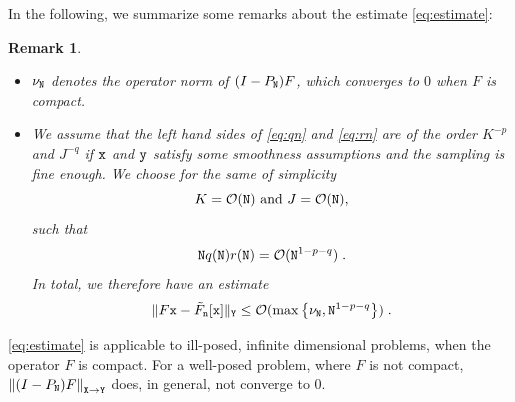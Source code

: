 \documentclass[10pt]{article}
\numberwithin{equation}{section}
\newtheorem{remark}[remark]{Remark}
\theoremstyle{nonumberplain}
\newcommand{\norm}[1]{\left\|#1\right\|}
\newcommand{\norms}[1]{\|#1\|}
\newcommand{\set}[1]{\left\{#1\right\}}
\newcommand{\X}{{\tt X}}
\newcommand{\Y}{{\tt Y}}
\newcommand{\y}{{\tt y}}
\newcommand{\n}{{\tt n}}
\newcommand{\x}{{\tt x}}
\newcommand{\no}{{\tt N}}
\begin{document}
In the following, we summarize some remarks about the estimate \autoref{eq:estimate}:
	\begin{remark}
	   \begin{itemize} 
	   	\item $\nu_\no$ denotes the operator norm of $(I-P_\no)F$, which converges to $0$ when $F$ is compact.
       \item We assume that the left hand sides of \autoref{eq:qn} and \autoref{eq:rn} are of the order $K^{-p}$ and $J^{-q}$ if $\x$ and $\y$ satisfy some smoothness assumptions \cite{Bar93} and the sampling is fine enough. We choose for the same of simplicity 
        \begin{equation*}
        	K = \mathcal{O}(\no) \text{ and } J = \mathcal{O}(\no),
        \end{equation*}
        such that 
        \begin{equation} \label{eq:no}
        	\no q(\no) r(\no) = \mathcal{O} (\no^{1-p-q})\;.
        \end{equation}
        In total, we therefore have an estimate 
        \begin{equation}\label{eq:final}
        	\norms{F\x-\tilde{F}_\n[\x]}_\Y \leq \mathcal{O}(\max \set{\nu_\no,\no^{1-p-q}})\;.
        \end{equation}
	   \end{itemize}
	\end{remark}
\autoref{eq:estimate} is applicable to ill-posed, infinite dimensional problems, when the operator $F$ is compact. For a well-posed problem, where $F$ is not compact, $\norm{(I-P_\no)F}_{\X \to \Y}$ does, in general, not converge to $0$.
	
\end{document}
